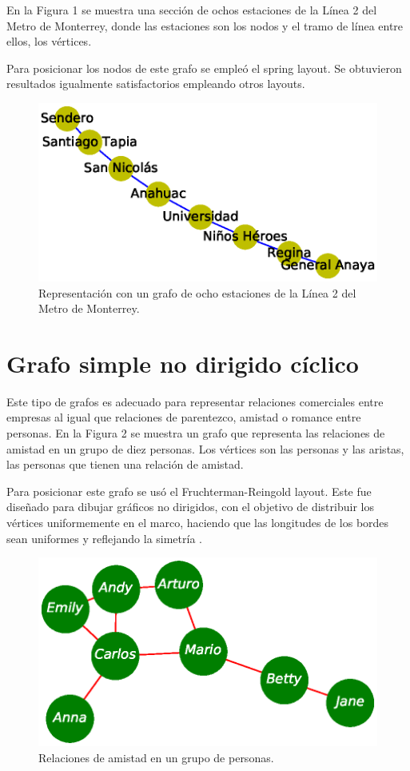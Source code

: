 \documentclass{article}
\begin{document}
En la Figura 1 se muestra una sección de ochos estaciones de la Línea 2 del Metro de Monterrey, donde las estaciones son los nodos y el tramo de línea entre ellos, los vértices. 

Para posicionar los nodos de este grafo se empleó el spring layout. Se obtuvieron resultados igualmente satisfactorios empleando otros layouts.

\begin{figure}
  \includegraphics[width=.8\columnwidth]{fig1.eps}
  \caption{Representación con un grafo de ocho estaciones de la Línea 2 del Metro de Monterrey.}
  \label{Figura 1}
\end{figure}



\section{Grafo simple no dirigido cíclico}

Este tipo de grafos es adecuado para representar relaciones comerciales entre empresas al igual que relaciones de parentezco, amistad o romance entre personas.
En la Figura 2 se muestra un grafo que representa las relaciones de amistad en un grupo de diez personas. Los vértices son las personas y las aristas, las personas que tienen una relación de amistad.

Para posicionar este grafo se usó el Fruchterman-Reingold layout. Este fue diseñado para dibujar gráficos no dirigidos, con el objetivo de distribuir los vértices uniformemente en el marco, haciendo que las longitudes de los bordes sean uniformes y reflejando la simetría \cite{fruchterman1991graph}.
 
\begin{figure}
  \includegraphics[width=.7\columnwidth]{fig2.eps}
  \caption{Relaciones de amistad en un grupo de personas.}
  \label{Figura 2}
\end{figure}
\end{document}
